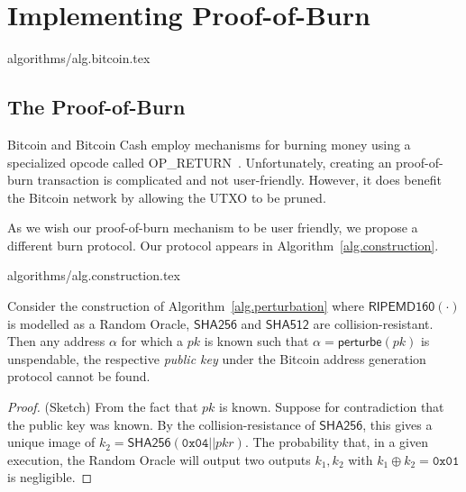 \section{Implementing Proof-of-Burn}

{algorithms/alg.bitcoin.tex}


\subsection{The Proof-of-Burn}
Bitcoin and Bitcoin Cash employ mechanisms for burning money using a specialized
opcode called \textsf{OP\_RETURN}~\cite{bartoletti2017analysis}. Unfortunately,
creating an  proof-of-burn transaction is complicated and not
user-friendly. However, it does benefit the Bitcoin network by allowing the UTXO
to be pruned.

As we wish our proof-of-burn mechanism to be user friendly, we propose a
different burn protocol. Our protocol appears in
Algorithm~\ref{alg.construction}.

{algorithms/alg.construction.tex}

\begin{lemma}[Unspendability]
  Consider the construction of Algorithm~\ref{alg.perturbation} where
  $\textsf{RIPEMD160}(\cdot)$ is modelled as a Random Oracle, $\textsf{SHA256}$
  and $\textsf{SHA512}$  are collision-resistant. Then any address $\alpha$ for
  which a $pk$ is known such that $\alpha = \textsf{perturbe}(pk)$ is
  unspendable, the respective \emph{public key} under the Bitcoin address
  generation protocol cannot be found.
\end{lemma}
\begin{proof}(Sketch)
  From the fact that $pk$ is known.
  Suppose for contradiction that the public key was known.
  By the collision-resistance of $\textsf{SHA256}$, this gives a unique image of
  $k_2 = \textsf{SHA256}(\texttt{0x04} || pkr)$.
  The probability that, in a given execution, the Random Oracle will output two
  outputs $k_1, k_2$ with $k_1 \oplus k_2 = \texttt{0x01}$ is negligible.
\end{proof}

